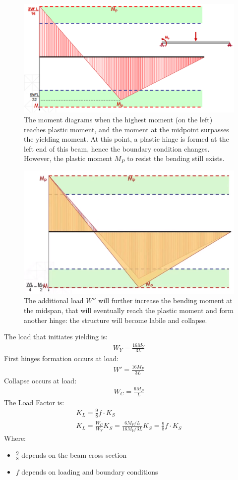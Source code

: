 \documentclass[class=report, crop=false, 12pt,a4paper]{standalone}
\begin{document}
\begin{figure}[H]
  \centering
  \includegraphics[width = 0.9 \textwidth]{../img/beam29.PNG}
  \caption{The moment diagrams when the highest moment (on the left) reaches plastic moment, and the moment at the midpoint surpasses the yielding moment. At this point, a plastic hinge is formed at the left end of this beam, hence the boundary condition changes. However, the plastic moment $M_P$ to resist the bending still exists.}
\end{figure}
\begin{figure}[H]
  \centering
  \includegraphics[width = 0.9 \textwidth]{../img/beam30.PNG}
  \caption{The additional load $W''$ will further increase the bending moment at the midspan, that will eventually reach the plastic moment and form another hinge: the structure will become labile and collapse.}
\end{figure}
The load that initiates yielding is:
\begin{gather}
  W_Y = \frac{16M_Y}{3L}
\end{gather}
First hinges formation occurs at load:
\begin{gather}
  W' = \frac{16M_P}{3L}
\end{gather}
Collapse occurs at load:
\begin{gather}
  W_C = \frac{6M_P}{L}
\end{gather}
The Load Factor is:
\begin{gather}
  K_L = \frac{9}{8}f\cdot K_S \\[5pt]
  K_L = \frac{W_C}{W_Y}K_S = \frac{6M_P/L}{16M_Y/3L}K_S = \frac{9}{8}f\cdot K_S
\end{gather}
Where:
\begin{itemize}
  \item $\frac{9}{8}$ depends on the beam cross section
  \item $f$ depends on loading and boundary conditions
\end{itemize}
\end{document}
